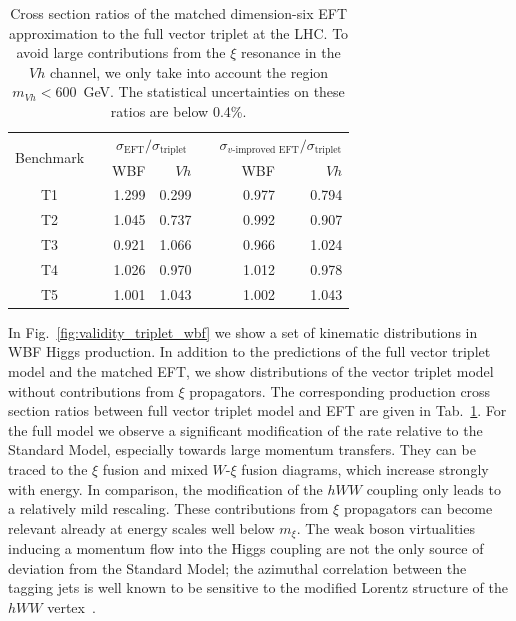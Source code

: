 \begin{table}[t] \renewcommand{\arraystretch}{1.2} \centering
    \begin{tabular}{c c rr c rr} \toprule \multirow{2}{*}{Benchmark}
&\hspace*{1em}& \multicolumn{2}{c}{$\sigma_\text{EFT} /
\sigma_\text{triplet}$} &\hspace*{1em}&
\multicolumn{2}{c}{$\sigma_\text{$v$-improved EFT} /
\sigma_\text{triplet}$}\\ \cmidrule{3-4} \cmidrule{6-7} && WBF & $Vh$
&& WBF & $Vh$ \\ \midrule T1 && 1.299 & 0.299 && 0.977 & 0.794 \\ T2
&& 1.045 & 0.737 && 0.992 & 0.907 \\ T3 && 0.921 & 1.066 && 0.966 &
1.024 \\ T4 && 1.026 & 0.970 && 1.012 & 0.978 \\ T5 && 1.001 & 1.043
&& 1.002 & 1.043 \\ \bottomrule
    \end{tabular}
    \caption{Cross section ratios of the matched dimension-six EFT
approximation to the full vector triplet at the LHC.  To avoid large
contributions from the $\xi$ resonance in the $Vh$ channel, we only
take into account the region $m_{Vh} < 600$~GeV.  The statistical
uncertainties on these ratios are below 0.4\%.}
  \label{tab:triplet_rates}
\end{table}

In Fig.~\ref{fig:validity_triplet_wbf} we show a set of kinematic distributions
in WBF Higgs production. In addition to the predictions of the full
vector triplet model and the matched EFT, we show distributions of the
vector triplet model without contributions from $\xi$ propagators.
The corresponding production cross section ratios between full vector
triplet model and EFT are given in Tab.~\ref{tab:triplet_rates}.  For
the full model we observe a significant modification of the rate
relative to the Standard Model, especially towards large momentum
transfers. They can be traced to the $\xi$ fusion and mixed $W$-$\xi$
fusion diagrams, which increase strongly with energy. In comparison,
the modification of the $hWW$ coupling only leads to a relatively mild
rescaling.  These contributions from $\xi$ propagators can become
relevant already at energy scales well below $m_\xi$. The weak boson
virtualities inducing a momentum flow into the Higgs coupling are not
the only source of deviation from the Standard Model; the azimuthal
correlation between the tagging jets is well known to be sensitive to
the modified Lorentz structure of the $hWW$ vertex~\cite{phi_jj}.

